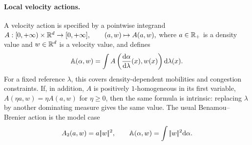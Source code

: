 \paragraph{Local velocity actions.}
A velocity action is specified by a pointwise integrand
\(A:[0,+\infty)\times\mathbb{R}^d\to[0,+\infty], \qquad (a,w)\mapsto A(a,w),\)
where $a\in\mathbb{R}_+$ is a density value and $w\in\mathbb{R}^d$ is a velocity value, and defines
\begin{equation}\label{eq-local-velocity-action}
\mathbb A(\alpha,w)
=
\int A\left(\frac{\mathrm{d}\alpha}{\mathrm{d}\lambda}(x),w(x)\right)\mathrm{d}\lambda(x).
\end{equation}
For a fixed reference $\lambda$, this covers density-dependent mobilities and congestion constraints. If, in addition, $A$ is positively $1$-homogeneous in its first variable, $A(\eta a,w)=\eta A(a,w)$ for $\eta\geq0$, then the same formula is intrinsic: replacing $\lambda$ by another dominating measure gives the same value. The usual Benamou--Brenier action is the model case
\begin{equation}\label{eq-bb-velocity-action}
A_2(a,w)=a|\!| w |\!|^2,
\qquad
\mathbb A(\alpha,w)=\int|\!| w |\!|^2\mathrm{d}\alpha.
\end{equation}
